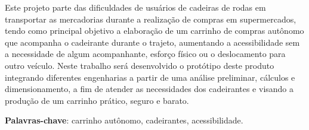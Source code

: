 \begin{resumo}

Este projeto parte das dificuldades de usuários de cadeiras de rodas em transportar as mercadorias durante a realização de compras em supermercados, tendo como principal objetivo a elaboração de um carrinho de compras autônomo que acompanha o cadeirante durante o trajeto, aumentando a acessibilidade sem a necessidade de algum acompanhante, esforço físico ou o deslocamento para outro veículo. Neste trabalho será desenvolvido o protótipo deste produto integrando diferentes engenharias a partir de uma análise preliminar, cálculos e dimensionamento, a fim de atender as necessidades dos cadeirantes e visando a produção de um carrinho prático, seguro e barato.

 \vspace{\onelineskip}
    
 \noindent
 \textbf{Palavras-chave}: carrinho autônomo, cadeirantes, acessibilidade.
\end{resumo}
